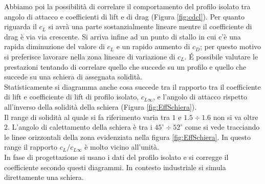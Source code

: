 Abbiamo poi la possibilità di correlare il comportamento del profilo isolato tra angolo di attacco e coefficienti di lift e di drag (Figura \ref{fig:cdcl}). Per quanto riguarda il $c_L$ si avrà una parte sostanzialmente lineare mentre il coefficiente di drag è via via crescente. Si arriva infine ad un punto di stallo in cui c'è una rapida diminuzione del valore di $c_L$ e un rapido aumento di $c_D$; per questo motivo si preferisce lavorare nella zona lineare di variazione di $c_L$. \'E possibile valutare le prestazioni tentando di correlare quello che succede su un profilo e quello che succede su una schiera di assegnata solidità.\\
Statisticamente si diagramma anche cosa succede tra il rapporto tra il coefficiente di lift e coefficiente di lift di profilo isolato, $c_{L \infty}$, e l'angolo di attacco rispetto all'inverso della solidità della schiera (Figura \ref{fig:EffSchiera}).\\
Il range di solidità al quale si fa riferimento varia tra $1$ e $ 1.5 \div 1.6$ non si va oltre $2$. L'angolo di calettamento della schiera è tra i $45^{\circ} \div 52^{\circ}$ come si vede tracciando le linee orizzontali della zona evidenziata nella figura \ref{fig:EffSchiera}. In questo range il rapporto $c_L / c_{L \infty}$ è molto vicino all'unità.\\
In fase di progettazione si usano i dati del profilo isolato e si corregge il coefficiente secondo questi diagrammi. In contesto industriale si simula direttamente una schiera.
